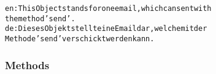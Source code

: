 \begin{alltt}

en: This Object stands for one email, which can sent with
    the method 'send'.
de: Dieses Objekt stellt eine Email dar, welche mit der
    Methode 'send' verschickt werden kann.
\end{alltt}



  \subsubsection{Methods}

    \vspace{0.5ex}

